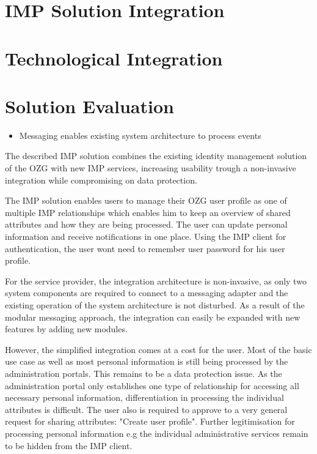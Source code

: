 \section{IMP Solution Integration}



\section{Technological Integration}



\section{Solution Evaluation}

\begin{itemize}
    \item Messaging enables existing system architecture to process events
\end{itemize}

The described IMP solution combines the existing identity management solution of the OZG with new IMP services, increasing usability trough a non-invasive integration while compromising on data protection.

The IMP solution enables users to manage their OZG user profile as one of multiple IMP relationships which enables him to keep an overview of shared attributes and how they are being processed. The user can update personal information and receive notifications in one place. Using the IMP client for authentication, the user wont need to remember user password for his user profile.

For the service provider, the integration architecture is non-invasive, as only two system components are required to connect to a messaging adapter and the existing operation of the system architecture is not disturbed. As a result of the modular messaging approach, the integration can easily be expanded with new features by adding new modules.

However, the simplified integration comes at a cost for the user. Most of the basic use case as well as most personal information is still being processed by the administration portals. This remains to be a data protection issue. As the administration portal only establishes one type of relationship for accessing all necessary personal information, differentiation in processing the individual attributes is difficult. The user also is required to approve to a very general request for sharing attributes: "Create user profile". Further legitimisation for processing personal information e.g the individual administrative services remain to be hidden from the IMP client.

